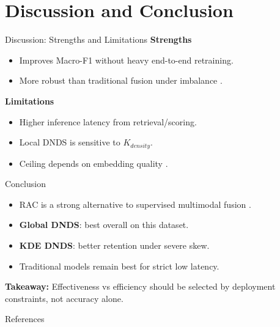 \documentclass[aspectratio=169]{beamer}
\begin{document}
\section{Discussion and Conclusion}
\begin{frame}{Discussion: Strengths and Limitations}
\textbf{Strengths}
\begin{itemize}
  \item Improves Macro-F1 without heavy end-to-end retraining.
  \item More robust than traditional fusion under imbalance \cite{long2022retrieval,lakatos2025investigating}.
\end{itemize}

\textbf{Limitations}
\begin{itemize}
  \item Higher inference latency from retrieval/scoring.
  \item Local DNDS is sensitive to $K_{density}$.
  \item Ceiling depends on embedding quality \cite{abimbola2026open,islam2026learning,li2025iris}.
\end{itemize}
\end{frame}

\begin{frame}{Conclusion}
\begin{itemize}
  \item RAC is a strong alternative to supervised multimodal fusion \cite{li2024kra,lakatos2025investigating}.
  \item \textbf{Global DNDS}: best overall on this dataset.
  \item \textbf{KDE DNDS}: better retention under severe skew.
  \item Traditional models remain best for strict low latency.
\end{itemize}

\vspace{8pt}
\centering
\textbf{Takeaway:} Effectiveness vs efficiency should be selected by deployment constraints, not accuracy alone.
\end{frame}

\begin{frame}[allowframebreaks]{References}
\scriptsize


\end{frame}
\end{document}
